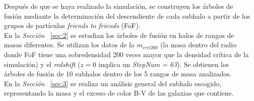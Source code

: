 Después de que se haya realizado la simulación, se construyen los árboles de fusión mediante la determinación del descendiente de cada subhalo a partir de los grupos de partículas \textit{friends to friends} (FoF). \\ 

En la \textit{Sección} ~\ref{sec:2} se estudian los árboles de fusión en halos de rangos de masas diferentes. Se utilizan los datos de la $m_{crit200}$ (la masa dentro del radio donde FoF tiene una sobredensidad 200 veces mayor que la densidad crítica de la simulación) y el \textit{redshift} ($z=0$ implica un \textit{StepNum = 63}). Se obtienen los árboles de fusión de 10 subhalos dentro de los 5 rangos de masa analizados. \\ 

En la \textit{Sección} ~\ref{sec:3} se realiza un análisis general del subhalo escogido, representando la masa y el exceso de color B-V de las galaxias que contiene. 

 
























